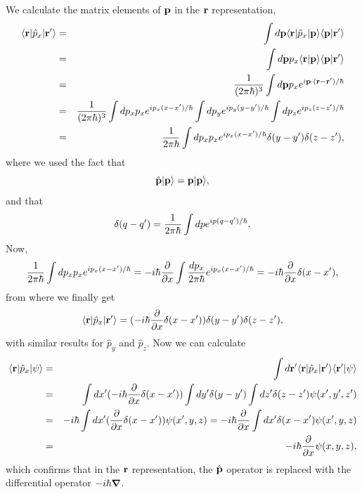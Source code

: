 \documentclass[floatfix,prb,aps,superscriptaddress,11pt,preprint]{revtex4}
\begin{document}
We calculate the matrix elements of $\mathbf{p}$ in the $\mathbf{r}$
representation,
\begin{eqnarray}\label{ap_matp}
\langle \mathbf{r} |\hat{p}_x| \mathbf{r}' \rangle&=&
\int d\mathbf{p}
\langle \mathbf{r} |\hat{p}_x| \mathbf{p} \rangle\langle {\mathbf{p}} | {\mathbf{r}'} \rangle \\ \nonumber
&=&
\int d\mathbf{p}
p_x\langle {\mathbf{r}} | {\mathbf{p}} \rangle\langle {\mathbf{p}} | {\mathbf{r}'} \rangle \\ \nonumber
&=&
\frac{1}{(2\pi\hbar)^3}
\int d\mathbf{p}
p_x
e^{i\mathbf{p}\cdot(\mathbf{r}-\mathbf{r}')/\hbar}
\\ \nonumber
&=&
\frac{1}{(2\pi\hbar)^3}
\int dp_x
p_x
e^{ip_x(x-x')/\hbar}
\int dp_y
e^{ip_y(y-y')/\hbar}
\int dp_z
e^{ip_z(z-z')/\hbar}
\\ \nonumber
&=&
\frac{1}{2\pi\hbar}
\int dp_x
p_x
e^{ip_x(x-x')/\hbar}
\delta(y-y')
\delta(z-z')
,
\end{eqnarray}
where we used the fact that
\begin{equation}\label{ap_otra}
\hat{\mathbf{p}}| \mathbf{p} \rangle=\mathbf{p}| \mathbf{p} \rangle
,
\end{equation}
and that
\begin{equation}\label{ap_delta}
\delta(q-q')=\frac{1}{2\pi\hbar}
\int dp
e^{ip(q-q')/\hbar}
.
\end{equation}
Now,
\begin{equation}\label{ap_mas}
\frac{1}{2\pi\hbar}
\int dp_x
p_x
e^{ip_x(x-x')/\hbar}
=
-i\hbar\frac{\partial}{\partial x}
\int
\frac{dp_x}{2\pi\hbar}
e^{ip_x(x-x')/\hbar}
=-i\hbar\frac{\partial}{\partial x}\delta(x-x')
,
\end{equation}
from where we finally get 
\begin{equation}\label{ap_fin}
\langle \mathbf{r} |\hat{p}_x| \mathbf{r}' \rangle=
(-i\hbar\frac{\partial}{\partial x}\delta(x-x'))
\delta(y-y')
\delta(z-z')
,
\end{equation}
with similar results for $\hat{p}_y$ and $\hat{p}_z$.
Now we can calculate
\begin{eqnarray}\label{ap_psi}
\langle \mathbf{r} |\hat{p}_x| \psi \rangle&=&
\int d\mathbf{r}' \langle \mathbf{r} |\hat{p}_x| \mathbf{r}' \rangle\langle {\mathbf{r}'} | {\psi} \rangle
\\ \nonumber
&=&
\int dx' (-i\hbar\frac{\partial}{\partial x}\delta(x-x'))
\int dy' \delta(y-y')
\int dz' \delta(z-z')
\psi(x',y',z')
\\ \nonumber
&=&
-i\hbar
\int dx' (\frac{\partial}{\partial x}\delta(x-x'))
\psi(x',y,z)
=
-i\hbar
\frac{\partial}{\partial x}
\int dx' 
\delta(x-x')
\psi(x',y,z)
\\ \nonumber
&=&
-i\hbar
\frac{\partial}{\partial x}
\psi(x,y,z)
,
\end{eqnarray}
which confirms that in the $\mathbf{r}$ representation,
the $\hat{\mathbf{p}}$ operator is replaced with the differential operator
$-i\hbar\boldsymbol{\nabla}$. 
\end{document}
